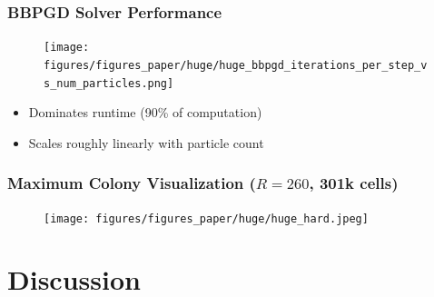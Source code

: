 \documentclass[10pt,t]{beamer}
\begin{document}
\begin{frame}
    \frametitle{BBPGD Solver Performance}

    \begin{figure}
        \centering
        \texttt{[image: figures/figures\_paper/huge/huge\_bbpgd\_iterations\_per\_step\_vs\_num\_particles.png]}
    \end{figure}

    \begin{itemize}
        \item Dominates runtime (90\% of computation)
        \item Scales roughly linearly with particle count
    \end{itemize}

\end{frame}


\begin{frame}
    \frametitle{Maximum Colony Visualization ($R = 260$, 301k cells)}


    \vspace{-0.3cm}
    \begin{figure}
        \centering
        \texttt{[image: figures/figures\_paper/huge/huge\_hard.jpeg]}
    \end{figure}

\end{frame}



\section{Discussion}
\end{document}
